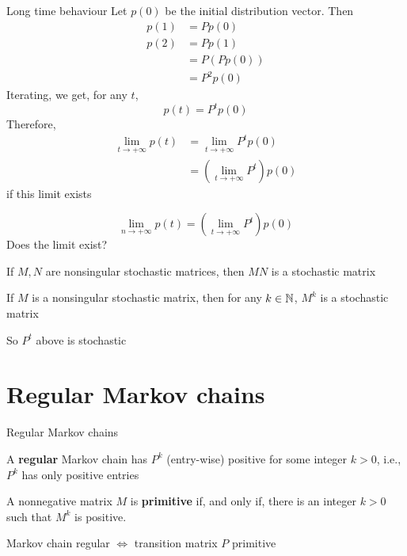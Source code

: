 \documentclass[aspectratio=169]{beamer}\usepackage[]{graphicx}\usepackage[]{xcolor}
\begin{document}
\begin{frame}{Long time behaviour}
Let $p(0)$ be the initial distribution vector. Then
\begin{align*}
p(1) &= Pp(0) \\
p(2) &= Pp(1)\\
&= P(Pp(0)) \\
&= P^2p(0)
\end{align*}
\vfill
Iterating, we get, for any $t$,
\[
p(t)=P^tp(0)
\]
\vfill
Therefore, 
\begin{align*}
\lim_{t\rightarrow +\infty}p(t) &=
\lim_{t\rightarrow +\infty}P^tp(0) \\
&=\left(\lim_{t\rightarrow +\infty}P^t\right)p(0)
\end{align*}
if this limit exists
\end{frame}


\begin{frame}
\[
\lim_{n\rightarrow +\infty}p(t) = 
\left(\lim_{t\rightarrow +\infty}P^t\right)p(0)
\]
Does the limit exist?
\vfill
\begin{theorem}
If $M,N$ are nonsingular stochastic matrices, then $MN$ is a stochastic matrix
\end{theorem}
\vfill
\begin{corollary}
If $M$ is a nonsingular stochastic matrix, then for any $k\in\mathbb{N}$, $M^k$ is a stochastic matrix
\end{corollary}
\vfill
So $P^t$ above is stochastic
\end{frame}


\section{Regular Markov chains}


\begin{frame}{Regular Markov chains}
\begin{definition}
A \textbf{regular} Markov chain has $P^k$ (entry-wise) positive for some integer $k>0$, i.e., $P^k$ has only positive entries
\end{definition}
\vfill
\begin{definition}
A nonnegative matrix $M$ is \textbf{primitive} if, and only if, there is an integer $k>0$ such that $M^k$ is positive.
\end{definition}
\vfill
\begin{theorem}
Markov chain regular $\iff$ transition matrix $P$ primitive
\end{theorem}
\end{frame}
\end{document}
